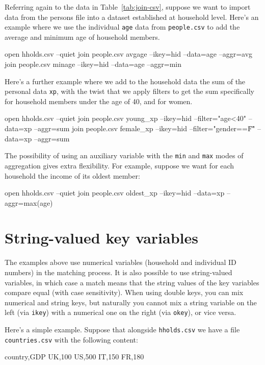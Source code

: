 Referring again to the data in Table~\ref{tab:join-csv}, suppose we
want to import data from the persons file into a dataset established
at household level.  Here's an example where we use the individual
\texttt{age} data from \texttt{people.csv} to add the average and
minimum age of household members.
\begin{code}
open hholds.csv --quiet
join people.csv avgage --ikey=hid --data=age --aggr=avg
join people.csv minage --ikey=hid --data=age --aggr=min
\end{code}

Here's a further example where we add to the household data the sum of
the personal data \texttt{xp}, with the twist that we apply filters to
get the sum specifically for household members under the age of 40,
and for women.
\begin{code}
open hholds.csv --quiet
join people.csv young_xp --ikey=hid --filter="age<40" --data=xp --aggr=sum
join people.csv female_xp --ikey=hid --filter="gender==\"F\"" --data=xp --aggr=sum
\end{code}

The possibility of using an auxiliary variable with the \texttt{min}
and \texttt{max} modes of aggregation gives extra flexibility. For
example, suppose we want for each household the income of its oldest
member:
\begin{code}
open hholds.csv --quiet
join people.csv oldest_xp --ikey=hid --data=xp --aggr=max(age)
\end{code}


\section{String-valued key variables}
\label{sec:join-strings}

The examples above use numerical variables (household and individual
ID numbers) in the matching process. It is also possible to use
string-valued variables, in which case a match means that the string
values of the key variables compare equal (with case sensitivity). 
When using double keys, you can mix numerical and string keys, but
naturally you cannot mix a string variable on the left (via
\texttt{ikey}) with a numerical one on the right (via \texttt{okey}),
or vice versa.

Here's a simple example. Suppose that alongside \texttt{hholds.csv} we
have a file \texttt{countries.csv} with the following content:
\begin{code}
 country,GDP
 UK,100
 US,500
 IT,150
 FR,180
\end{code}

